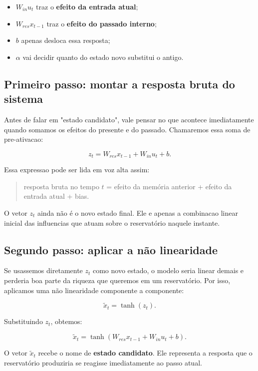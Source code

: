 \documentclass[12pt]{article}
\providecommand{\tightlist}{%
              \setlength{\itemsep}{0pt}\setlength{\parskip}{0pt}}
\begin{document}
\begin{itemize}
\tightlist
\item
  \(W_{in} u_t\) traz o \textbf{efeito da entrada atual};
\item
  \(W_{res} x_{t-1}\) traz o \textbf{efeito do passado interno};
\item
  \(b\) apenas desloca essa resposta;
\item
  \(\alpha\) vai decidir quanto do estado novo substitui o antigo.
\end{itemize}

\subsection{Primeiro passo: montar a resposta bruta do sistema}\label{33-primeiro-passo-montar-a-resposta-bruta-do-sistema}

Antes de falar em "estado candidato", vale pensar no que acontece imediatamente quando somamos os efeitos do presente e do passado. Chamaremos essa soma de pre-ativacao:

\[
z_t = W_{res} x_{t-1} + W_{in} u_t + b.
\]

Essa expressao pode ser lida em voz alta assim:

\begin{quote}
resposta bruta no tempo \(t\) = efeito da memória anterior + efeito da entrada atual + bias.
\end{quote}

O vetor \(z_t\) ainda não é o novo estado final. Ele e apenas a combinacao linear inicial das influencias que atuam sobre o reservatório naquele instante.

\subsection{Segundo passo: aplicar a não linearidade}\label{34-segundo-passo-aplicar-a-nuxe3o-linearidade}

Se usassemos diretamente \(z_t\) como novo estado, o modelo seria linear demais e perderia boa parte da riqueza que queremos em um reservatório. Por isso, aplicamos uma não linearidade componente a componente:

\[
\widetilde{x}_t = \tanh(z_t).
\]

Substituindo \(z_t\), obtemos:

\[
\widetilde{x}_t = \tanh(W_{res} x_{t-1} + W_{in} u_t + b).
\]

O vetor \(\widetilde{x}_t\) recebe o nome de \textbf{estado candidato}. Ele representa a resposta que o reservatório produziria se reagisse imediatamente ao passo atual.
\end{document}
